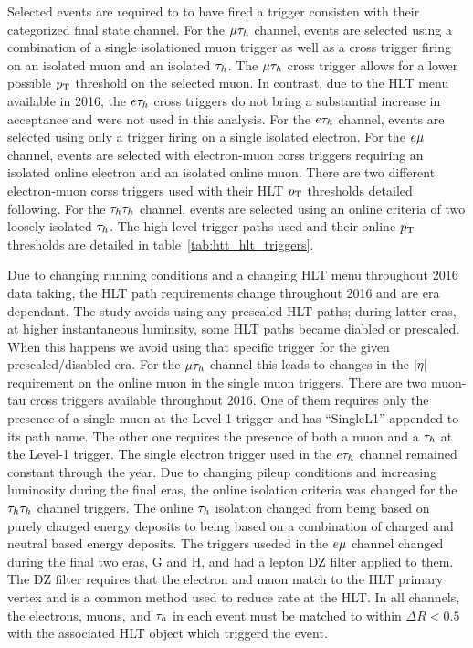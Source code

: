 Selected events are required to to have fired a trigger consisten with their categorized final
state channel.  For the $\mu\tau_{h}$ channel, events are selected using a combination
of a single isolationed muon trigger as well as a cross trigger firing on an isolated muon and
an isolated $\tau_{h}$.  The $\mu\tau_{h}$ cross trigger allows for a lower possible $p_\mathrm{T}$ threshold
on the selected muon.  In contrast, due to the HLT menu available in 2016, the $e\tau_{h}$ cross triggers
do not bring a substantial increase in acceptance and were not used in this analysis.
For the $e\tau_{h}$ channel, events are selected using only a trigger firing on a 
single isolated electron.  For the $e\mu$ channel, events are selected with electron-muon corss
triggers requiring an isolated online electron and an isolated online muon.  There are two 
different electron-muon corss triggers used with their HLT $p_\mathrm{T}$ thresholds detailed following.
For the $\tau_{h}\tau_{h}$ channel, events are selected using an online criteria of two loosely isolated $\tau_{h}$.  
The high level trigger paths used and their online $p_\mathrm{T}$ thresholds are detailed in table~\ref{tab:htt_hlt_triggers}.

Due to changing running conditions and a changing HLT menu throughout 2016 data taking, the HLT path
requirements change throughout 2016 and are era dependant.  The study avoids using any prescaled
HLT paths; during latter eras, at higher instantaneous luminsity, some HLT paths became diabled
or prescaled.  When this happens we avoid using that specific trigger for the given prescaled/disabled
era.  For the $\mu\tau_{h}$ channel this 
leads to changes in the $\lvert\eta\rvert$ requirement on the online muon in the single muon triggers.
There are two muon-tau cross triggers available throughout 2016.  One of them requires only the
presence of a single muon at the Level-1 trigger and has ``SingleL1'' appended to its path
name.  The other one requires the presence of both a muon and a $\tau_{h}$ at the Level-1 trigger.
The single electron trigger used in the $e\tau_{h}$ channel remained constant through the year.
Due to changing pileup conditions and increasing luminosity during the final eras, the online
isolation criteria was changed for the $\tau_{h}\tau_{h}$ channel triggers.  The online $\tau_{h}$ 
isolation changed from being based on purely charged energy deposits to being based on a 
combination of charged and neutral based energy deposits.  The triggers useded in the
$e\mu$ channel changed during the final two eras, G and H, and had a lepton DZ filter
applied to them.  The DZ filter requires that the electron and muon match to the HLT primary
vertex and is a common method used to reduce rate at the HLT.  In all channels, the electrons, muons, and
$\tau_{h}$ in each event must be matched to within $\Delta R < 0.5$ with the associated
HLT object which triggerd the event.


